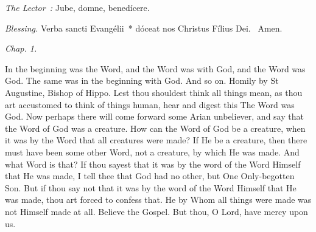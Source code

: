{{  }

  {
    \medskip

    \emph{The Lector~:} Jube, domne, benedícere.

    \emph{Blessing.} Verba sancti Evangélii~* dóceat nos Christus Fílius Dei. \Rbar{}~Amen.
  }

  \bigskip{}
  {


  }

  {
    \hspace{10ex}{Lesson IX.}\hfill\emph{Chap. 1.}\hspace{10ex}

    \begin{parcolumns}[rulebetween,colwidths={1=.51\linewidth}]{2}
    {In the beginning was the Word, and the Word was with God, and the Word was God. The same was in the beginning with God. And so on.
Homily by St Augustine, Bishop of Hippo.
Lest thou shouldest think all things mean, as thou art accustomed to think of things human, hear and digest this The Word was God. Now perhaps there will come forward some Arian unbeliever, and say that the Word of God was a creature. How can the Word of God be a creature, when it was by the Word that all creatures were made? If He be a creature, then there must have been some other Word, not a creature, by which He was made. And what Word is that? If thou sayest that it was by the word of the Word Himself that He was made, I tell thee that God had no other, but One Only-begotten Son. But if thou say not that it was by the word of the Word Himself that He was made, thou art forced to confess that. He by Whom all things were made was not Himself made at all. Believe the Gospel.
      But thou, O Lord, have mercy upon us.}
    \end{parcolumns}

}}
